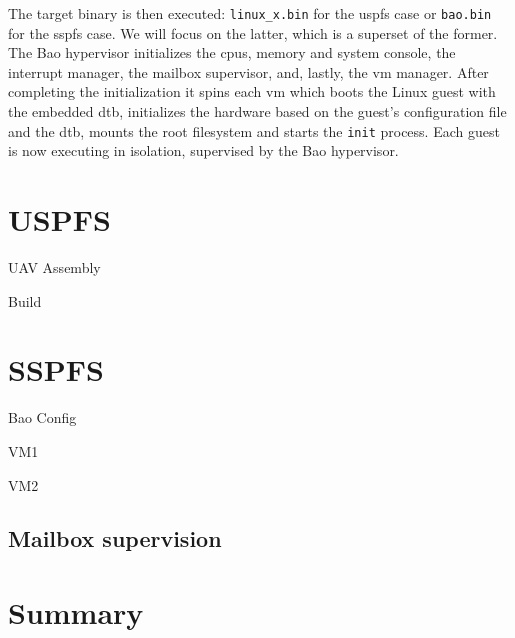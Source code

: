 The target binary is then executed: \texttt{linux\_x.bin} for the \gls{uspfs}
case or \texttt{bao.bin} for the \gls{sspfs} case. We will focus on the latter,
which is a superset of the former. The Bao hypervisor initializes the
\glspl{cpu}, memory and system console, the interrupt manager, the mailbox
supervisor, and, lastly, the \gls{vm} manager. After completing the
initialization it spins each \gls{vm} which boots the Linux guest with the
embedded \gls{dtb}, initializes the hardware based on the guest's configuration
file and the \gls{dtb}, mounts the root filesystem and starts the \texttt{init}
process. Each guest is now executing in isolation, supervised by the Bao hypervisor.

\section{USPFS}
\label{sec:uspfs-implem}

UAV Assembly

Build

\section{SSPFS}
\label{sec:sspfs-implem}

Bao Config

VM1

VM2

\subsection{Mailbox supervision}
\label{sec:mailbox-supervision}



\section{Summary}
\label{sec:summary-implem}



